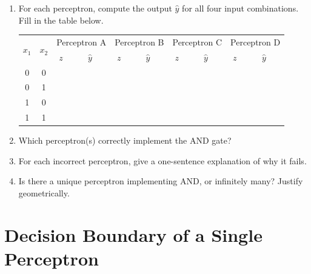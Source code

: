 \documentclass[11pt, a4paper]{article}
\begin{document}
\vspace{0.8em}

\begin{enumerate}[label=\textbf{\arabic*.}, leftmargin=*, itemsep=0.9em]

  \item For each perceptron, compute the output $\hat{y}$ for all four input combinations. Fill in the table below.

\vspace{0.5em}
\begin{center}
\renewcommand{\arraystretch}{1.5}
\begin{tabular}{cc|cccc|cccc|cccc|cccc}
\toprule
\multirow{2}{*}{$x_1$} & \multirow{2}{*}{$x_2$} &
\multicolumn{4}{c|}{Perceptron A} &
\multicolumn{4}{c|}{Perceptron B} &
\multicolumn{4}{c|}{Perceptron C} &
\multicolumn{4}{c}{Perceptron D} \\
& & $z$ & & $\hat{y}$ & & $z$ & & $\hat{y}$ & & $z$ & & $\hat{y}$ & & $z$ & & $\hat{y}$ & \\
\midrule
0 & 0 & & & & & & & & & & & & & & & & \\
0 & 1 & & & & & & & & & & & & & & & & \\
1 & 0 & & & & & & & & & & & & & & & & \\
1 & 1 & & & & & & & & & & & & & & & & \\
\bottomrule
\end{tabular}
\end{center}

  \item Which perceptron(s) correctly implement the AND gate?

  \vspace{2.5em}

  \item For each incorrect perceptron, give a one-sentence explanation of why it fails.

  \vspace{3.5em}

  \item Is there a unique perceptron implementing AND, or infinitely many? Justify geometrically.

  \vspace{3em}

\end{enumerate}

\section{Decision Boundary of a Single Perceptron}
\end{document}
